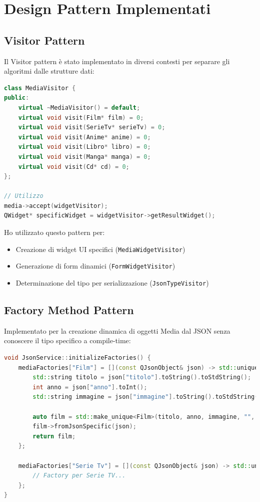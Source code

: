 \documentclass[a4paper,10pt]{article}
\begin{document}
\section{Design Pattern Implementati}

\subsection{Visitor Pattern}
Il Visitor pattern è stato implementato in diversi contesti per separare gli algoritmi dalle strutture dati:

\begin{lstlisting}[language=cpp, style=cppstyle]
class MediaVisitor {
public:
    virtual ~MediaVisitor() = default;
    virtual void visit(Film* film) = 0;
    virtual void visit(SerieTv* serieTv) = 0;
    virtual void visit(Anime* anime) = 0;
    virtual void visit(Libro* libro) = 0;
    virtual void visit(Manga* manga) = 0;
    virtual void visit(Cd* cd) = 0;
};

// Utilizzo
media->accept(widgetVisitor);
QWidget* specificWidget = widgetVisitor->getResultWidget();
\end{lstlisting}

Ho utilizzato questo pattern per:
\begin{itemize}
    \item Creazione di widget UI specifici (\texttt{MediaWidgetVisitor})
    \item Generazione di form dinamici (\texttt{FormWidgetVisitor})  
    \item Determinazione del tipo per serializzazione (\texttt{JsonTypeVisitor})
\end{itemize}

\subsection{Factory Method Pattern}
Implementato per la creazione dinamica di oggetti Media dal JSON senza conoscere il tipo specifico a compile-time:

\begin{lstlisting}[language=cpp, style=cppstyle]
void JsonService::initializeFactories() {
    mediaFactories["Film"] = [](const QJsonObject& json) -> std::unique_ptr<Media> {
        std::string titolo = json["titolo"].toString().toStdString();
        int anno = json["anno"].toInt();
        std::string immagine = json["immagine"].toString().toStdString();
        
        auto film = std::make_unique<Film>(titolo, anno, immagine, "", "", 0);
        film->fromJsonSpecific(json);
        return film;
    };
    
    mediaFactories["Serie Tv"] = [](const QJsonObject& json) -> std::unique_ptr<Media> {
        // Factory per Serie TV...
    };
}
\end{lstlisting}
\end{document}

